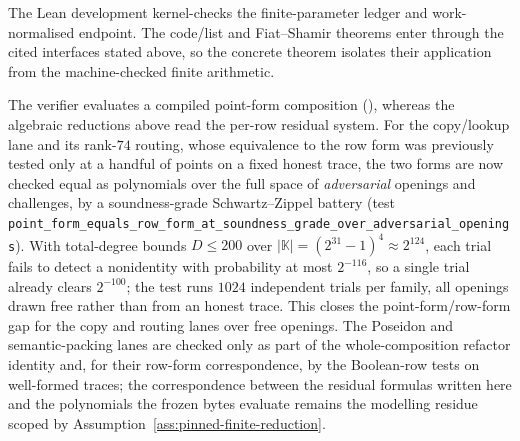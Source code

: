 The Lean development kernel-checks the finite-parameter ledger and
work-normalised endpoint. The code/list and Fiat--Shamir theorems enter through
the cited interfaces stated above, so the concrete theorem isolates their
application from the machine-checked finite arithmetic.

\begin{remark}
\label{rem:point-row-equivalence}
The verifier evaluates a compiled point-form composition
(), whereas the
algebraic reductions above read the per-row residual system.  For the
copy/lookup lane and its rank-\(74\) routing, whose equivalence to the row form
was previously tested only at a handful of points on a fixed honest trace,
the two forms are now checked equal as polynomials over the
full space of \emph{adversarial} openings and challenges, by a soundness-grade
Schwartz--Zippel battery (test
\texttt{point\_form\_equals\_row\_form\_at\_soundness\_grade\_over\_adversarial\_openings}).
With total-degree bounds \(D\le200\) over \(|\mathbb K|=(2^{31}-1)^4\approx2^{124}\),
each trial fails to detect a nonidentity with probability at most \(2^{-116}\),
so a single trial already clears \(2^{-100}\); the test runs \(1024\)
independent trials per family, all openings drawn free rather than from an
honest trace.  This closes the point-form/row-form gap for the copy and routing
lanes over free openings.  The Poseidon and semantic-packing lanes are checked
only as part of the whole-composition refactor identity and, for their row-form
correspondence, by the Boolean-row tests on well-formed traces; the
correspondence between the residual formulas written here and the polynomials
the frozen bytes evaluate remains the modelling residue scoped by
Assumption~\ref{ass:pinned-finite-reduction}.
\end{remark}

